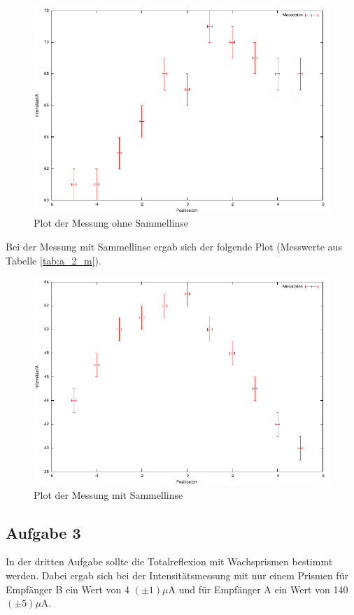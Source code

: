 \documentclass[12pt]{scrartcl}
\begin{document}
\begin{figure}[H]
\centering
    \includegraphics[scale = 1]{a_2_o.pdf}
  	\caption[Plot der Messung ohne Sammellinse]{Plot der Messung ohne Sammellinse}
  \label{fig:a_2_o}
\end{figure}

Bei der Messung mit Sammellinse ergab sich der folgende Plot (Messwerte aus Tabelle \ref{tab:a_2_m}).


\begin{figure}[H]
\centering
    \includegraphics[scale = 1]{a_2_m.pdf}
  	\caption[Plot der Messung mit Sammellinse]{Plot der Messung mit Sammellinse}
  \label{fig:a_2_m}
\end{figure}



\subsection{Aufgabe 3}
In der dritten Aufgabe sollte die Totalreflexion mit Wachsprismen bestimmt werden.
Dabei ergab  sich bei der Intensitätsmessung mit nur einem Prismen  für Empfänger B ein Wert von 4	$(\pm 1) \mu$A und für Empfänger A ein Wert von 140 $(\pm 5) \mu$A.
\end{document}
